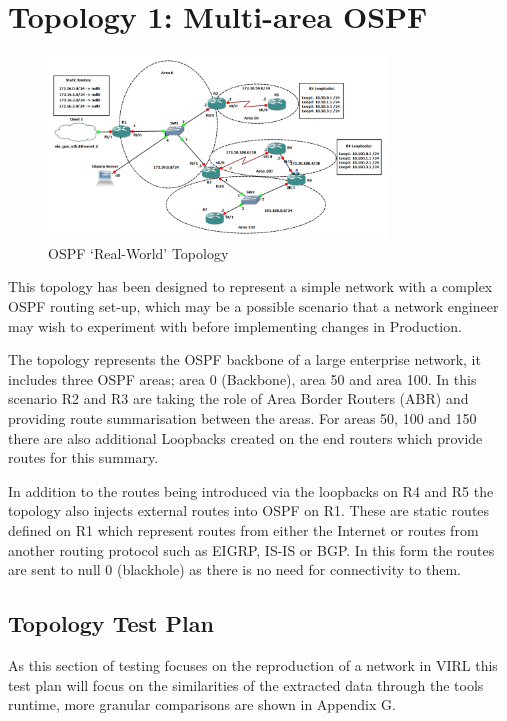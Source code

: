\documentclass[11pt]{report}
\begin{document}
\section{Topology 1: Multi-area OSPF}

\begin{figure}[h!]
	\caption{OSPF `Real-World' Topology}
	\centering
	\begin{center}
	\includegraphics[width=0.8\textwidth]{OSPF-Topology.png}
	\end{center}
\end{figure}

This topology has been designed to represent a simple network with a complex OSPF routing set-up, which may be a possible scenario that a network engineer may wish to experiment with before implementing changes in Production.

The topology represents the OSPF backbone of a large enterprise network, it includes three OSPF areas; area 0 (Backbone), area 50 and area 100. In this scenario R2 and R3 are taking the role of Area Border Routers (ABR) and providing route summarisation between the areas. For areas 50, 100 and 150 there are also additional Loopbacks created on the end routers which provide routes for this summary.

In addition to the routes being introduced via the loopbacks on R4 and R5 the topology also injects external routes into OSPF on R1. These are static routes defined on R1 which represent routes from either the Internet or routes from another routing protocol such as EIGRP, IS-IS or BGP. In this form the routes are sent to null 0 (blackhole) as there is no need for connectivity to them.

\subsection{Topology Test Plan}

As this section of testing focuses on the reproduction of a network in VIRL this test plan will focus on the similarities of the extracted data through the tools runtime, more granular comparisons are shown in Appendix G.
\end{document}
